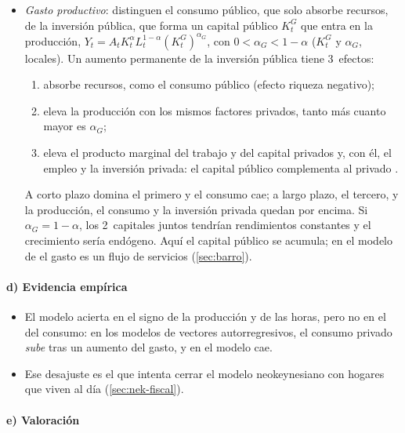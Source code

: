 \documentclass[11pt]{article}
\begin{document}
\begin{itemize}
\item \emph{Gasto productivo}: \textcite{BaxterKing1993Fiscal} distinguen el consumo público, que solo absorbe recursos, de la inversión pública, que forma un capital público $K^G_t$ que entra en la producción, $Y_t=A_tK_t^{\alpha}L_t^{1-\alpha}(K^G_t)^{\alpha_G}$, con $0<\alpha_G<1-\alpha$ ($K^G_t$ y $\alpha_G$, locales). Un aumento permanente de la inversión pública tiene 3~efectos:
  \begin{enumerate}
  \item absorbe recursos, como el consumo público (efecto riqueza negativo);
  \item eleva la producción con los mismos factores privados, tanto más cuanto mayor es $\alpha_G$;
  \item eleva el producto marginal del trabajo y del capital privados y, con él, el empleo y la inversión privada: el capital público complementa al privado .
  \end{enumerate}
  A corto plazo domina el primero y el consumo cae; a largo plazo, el tercero, y la producción, el consumo y la inversión privada quedan por encima. Si $\alpha_G=1-\alpha$, los 2~capitales juntos tendrían rendimientos constantes y el crecimiento sería endógeno. Aquí el capital público se acumula; en el modelo de  el gasto es un flujo de servicios (\ref{sec:barro}).
\end{itemize}

\paragraph{d) Evidencia empírica}

\begin{itemize}
\item El modelo acierta en el signo de la producción y de las horas, pero no en el del consumo: en los modelos de vectores autorregresivos, el consumo privado \emph{sube} tras un aumento del gasto\nocite{BlanchardPerotti2002Empirical,GaliLopezSalidoValles2007}, y en el modelo cae.
\item Ese desajuste es el que intenta cerrar el modelo neokeynesiano con hogares que viven al día (\ref{sec:nek-fiscal}).
\end{itemize}

\paragraph{e) Valoración}
\end{document}
